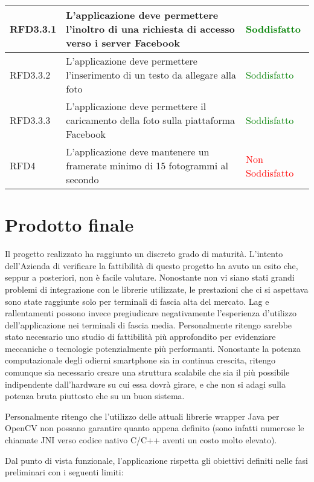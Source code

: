 \begin{center}
\begin{longtable}{ | p{2cm} | p{7cm} | p{2cm} |}
    RFD3.3.1 &  L'applicazione deve permettere l'inoltro di una richiesta di accesso verso i server Facebook & \textcolor{green}{Soddisfatto} \\ \hline
    RFD3.3.2 &  L'applicazione deve permettere l'inserimento di un testo da allegare alla foto & \textcolor{green}{Soddisfatto} \\ \hline
    RFD3.3.3 &  L'applicazione deve permettere il caricamento della foto sulla piattaforma Facebook & \textcolor{green}{Soddisfatto} \\ \hline
    RFD4 &  L'applicazione deve mantenere un framerate minimo di 15 fotogrammi al secondo & \textcolor{red}{Non Soddisfatto} \\ \hline
    \end{longtable}
\end{center}


\newpage
\section{Prodotto finale}

Il progetto realizzato ha raggiunto un discreto grado di maturità. L'intento dell'Azienda di verificare la fattibilità di questo progetto ha avuto un esito che, seppur a posteriori, non è facile valutare. Nonostante non vi siano stati grandi problemi di integrazione con le librerie utilizzate, le prestazioni che ci si aspettava sono state raggiunte solo per terminali di fascia alta del mercato. Lag e rallentamenti possono invece pregiudicare negativamente l'esperienza d'utilizzo dell'applicazione nei terminali di fascia media. Personalmente ritengo sarebbe stato necessario uno studio di fattibilità più approfondito per evidenziare meccaniche o tecnologie potenzialmente più performanti. Nonostante la potenza computazionale degli odierni smartphone sia in continua crescita, ritengo comunque sia necessario creare una struttura scalabile che sia il più possibile indipendente dall'hardware su cui essa dovrà girare, e che non si adagi sulla potenza bruta piuttosto che su un buon sistema. 

Personalmente ritengo che l'utilizzo delle attuali librerie wrapper Java per OpenCV non possano garantire quanto appena definito (sono infatti numerose le chiamate JNI verso codice nativo C/C++ aventi un costo molto elevato). 

Dal punto di vista funzionale, l'applicazione rispetta gli obiettivi definiti nelle fasi preliminari con i seguenti limiti:

